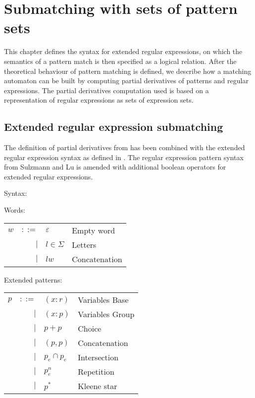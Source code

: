 \chapter{Submatching with sets of pattern sets}
\label{submatching}

This chapter defines the syntax for extended regular expressions, on which the
semantics of a pattern match is then specified as a logical relation.  After the
theoretical behaviour of pattern matching is defined, we describe how a matching
automaton can be built by computing partial derivatives of patterns and regular
expressions. The partial derivatives computation used is based on a
representation of regular expressions as sets of expression sets.


\section{Extended regular expression submatching}
\label{ere-submatch}

The definition of partial derivatives from \cite{pdpat} has been combined with
the extended regular expression syntax as defined in \cite{pdere}. The regular
expression pattern syntax from Sulzmann and Lu is amended with additional
boolean operators for extended regular expressions.

\begin{defn}
   \label{defn-syn}
   Syntax:

   Words:

   \begin{tabular}{lrll}
      $w$	& $::=$	& $\varepsilon$		& Empty word	\\
		& $|$	& $l \in \Sigma$	& Letters	\\
		& $|$	& $lw$			& Concatenation	\\
   \end{tabular}

   Extended patterns:

   \begin{tabular}{lrll}
      $p$	& $::=$	& $(x:r)$			& Variables Base	\\
		& $|$	& $(x:p)$			& Variables Group	\\
		& $|$	& $p+p$				& Choice		\\
		& $|$	& $(p,p)$			& Concatenation		\\
		& $|$	& $p_e \cap p_e$		& Intersection		\\
        	& $|$	& $p_e^n$			& Repetition		\\
		& $|$	& $p^*$				& Kleene star		\\
   \end{tabular}
\end{defn}


